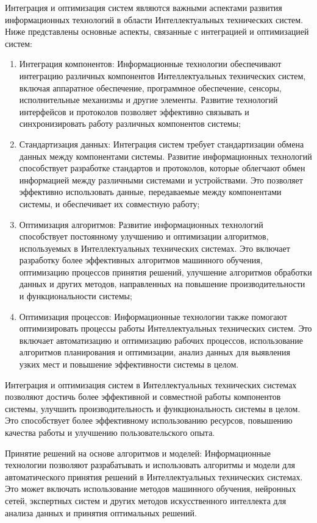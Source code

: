     Интеграция и оптимизация систем являются важными аспектами развития информационных технологий в области Интеллектуальных технических систем. Ниже представлены основные аспекты, связанные с интеграцией и оптимизацией систем:
    \begin{enumerate}
        \item Интеграция компонентов: Информационные технологии обеспечивают интеграцию различных компонентов Интеллектуальных технических систем, включая аппаратное обеспечение, программное обеспечение, сенсоры, исполнительные механизмы и другие элементы. Развитие технологий интерфейсов и протоколов позволяет эффективно связывать и синхронизировать работу различных компонентов системы;
        \item Стандартизация данных: Интеграция систем требует стандартизации обмена данных между компонентами системы. Развитие информационных технологий способствует разработке стандартов и протоколов, которые облегчают обмен информацией между различными системами и устройствами. Это позволяет эффективно использовать данные, передаваемые между компонентами системы, и обеспечивает их совместную работу;
        \item Оптимизация алгоритмов: Развитие информационных технологий способствует постоянному улучшению и оптимизации алгоритмов, используемых в Интеллектуальных технических системах. Это включает разработку более эффективных алгоритмов машинного обучения, оптимизацию процессов принятия решений, улучшение алгоритмов обработки данных и других методов, направленных на повышение производительности и функциональности системы;
        \item Оптимизация процессов: Информационные технологии также помогают оптимизировать процессы работы Интеллектуальных технических систем. Это включает автоматизацию и оптимизацию рабочих процессов, использование алгоритмов планирования и оптимизации, анализ данных для выявления узких мест и повышение эффективности системы в целом.
    \end{enumerate}

    Интеграция и оптимизация систем в Интеллектуальных технических системах позволяют достичь более эффективной и совместной работы компонентов системы, улучшить производительность и функциональность системы в целом. Это способствует более эффективному использованию ресурсов, повышению качества работы и улучшению пользовательского опыта.

    Принятие решений на основе алгоритмов и моделей: Информационные технологии позволяют разрабатывать и использовать алгоритмы и модели для автоматического принятия решений в Интеллектуальных технических системах. Это может включать использование методов машинного обучения, нейронных сетей, экспертных систем и других методов искусственного интеллекта для анализа данных и принятия оптимальных решений.
    
